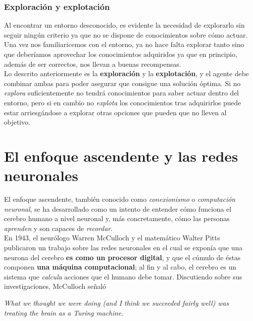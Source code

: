 \subsubsection{Exploración y explotación} \label{explorationExploitation}

Al encontrar un entorno desconocido, es evidente la necesidad de explorarlo sin seguir ningún criterio ya que no se dispone de conocimientos sobre cómo actuar. Una vez nos familiaricemos con el entorno, ya no hace falta explorar tanto sino que deberíamos aprovechar los conocimientos adquiridos ya que en principio, además de ser correctos, nos llevan a buenas recompensas. \\

Lo descrito anteriormente es la \textbf{exploración} y la \textbf{explotación}, y el agente debe combinar ambas para poder asegurar que consigue una solución óptima. Si no \textit{explora} suficientemente no tendrá conocimientos para saber actuar dentro del entorno, pero si en cambio no \textit{explota} los conocimientos tras adquirirlos puede estar arriesgándose a explorar otras opciones que pueden que no lleven al objetivo. 


\section{El enfoque ascendente y las redes neuronales}

El enfoque ascendente, también conocido como \textit{conexionismo} o \textit{computación neuronal}, se ha desarrollado como un intento de entender cómo funciona el cerebro humano a nivel neuronal y, más concretamente, cómo las personas \textit{aprenden} y son capaces de \textit{recordar}. \\

En 1943, el neurólogo Warren McCulloch y el matemático Walter Pitts publicaron un trabajo \cite{mcculloch1943logical} sobre las redes neuronales en el cual se exponía que una neurona del cerebro \textbf{es como un procesor digital}, y que el cúmulo de éstas componen \textbf{una máquina computacional}; al fin y al cabo, el cerebro es un sistema que \textit{calcula} acciones que el humano debe tomar. Discutiendo sobre sus investigaciones, McCulloch señaló

\begin{displayquote}\textit{
What we thought we were doing (and I think we succeeded fairly well) was treating the brain as a Turing machine.}
\end{displayquote}

